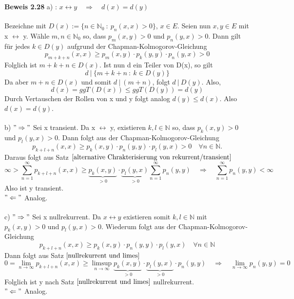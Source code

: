 \textbf{Beweis 2.28}
a) : $x \leftrightarrow y \quad \Rightarrow \quad d(x) = d(y)$
\\
\\
Bezeichne mit $D(x) := \lbrace n \in \mathbb{N}_{0} \: : \: p_{n}(x,x)>0 \rbrace$, $x \in E$. Seien nun $x,y \in E$ mit x $\leftrightarrow$ y. Wähle $m,n \in \mathbb{N}_{0}$ so, dass $p_{m}(x,y)>0$ und $p_{n}(y,x)>0$. Dann gilt für jedes $k \in D(y)$ aufgrund der Chapman-Kolmogorov-Gleichung
\begin{equation*}
p_{m+k+n}(x,x) \geq p_{m}(x,y) \cdot p_{k}(y,y) \cdot p_{n}(y,x) > 0
\end{equation*}
Folglich ist $m+k+n \in D(x)$. Ist nun d ein Teiler von D(x), so gilt
\begin{equation*}
 d \: | \: \lbrace m+k+n \: : \: k \in D(y) \rbrace
\end{equation*} 
Da aber $m+n \in D(x)$ und somit $d \: | \: (m+n)$, folgt $d \: | \: D(y)$. Also, 
\begin{equation*}
d(x) = ggT(D(x)) \leq ggT(D(y)) = d(y)
\end{equation*}
Durch Vertauschen der Rollen von x und y folgt analog $d(y) \leq d(x)$. Also $d(x) = d(y)$.
\\
\\
b) $"\Rightarrow"$ Sei x transient. Da x $\leftrightarrow$ y, existieren $k,l \in \mathbb{N}$ so, dass  $p_{k}(x,y)>0$ und $p_{l}(y,x)>0$. Dann folgt aus der Chapman-Kolmogorov-Gleichung
\begin{equation*}
p_{k+l+n}(x,x) \geq p_{k}(x,y) \cdot p_{n}(y,y) \cdot p_{l}(y,x) > 0 \quad \forall n \in \mathbb{N}.
\end{equation*}
Daraus folgt aus Satz $\ref{alternative Chrakterisierung von rekurrent/transient}$ 
\begin{equation*}
\infty > \sum_{n=1}^{\infty} p_{k+l+n}(x,x) \geq \underbrace{p_{k}(x,y)}_{>0} \cdot \underbrace{p_{l}(y,x)}_{>0} \sum_{n=1}^{\infty} p_{n}(y,y) \quad \Rightarrow \quad \sum_{n=1}^{\infty} p_{n}(y,y) < \infty
\end{equation*}
Also ist y transient.
\\
$"\Leftarrow"$ Analog.
\\
\\
c) \: $"\Rightarrow"$ Sei x nullrekurrent. Da $x \leftrightarrow y$ existieren somit $k,l \in \mathbb{N}$ mit $p_{k}(x,y) > 0$ und $p_{l}(y,x) > 0$. Wiederum folgt aus der Chapman-Kolmogorov-Gleichung
\begin{equation*}
p_{k+l+n}(x,x) \geq p_{k}(x,y) \cdot p_{n}(y,y) \cdot p_{l}(y,x) \quad \forall n \in \mathbb{N}
\end{equation*}
Dann folgt aus Satz $\ref{nullrekurrent und limes}$
\begin{equation*}
0 = \lim_{n \to \infty}p_{k+l+n}(x,x) \geq \limsup_{n \to \infty} \underbrace{p_{k}(x,y)}_{>0} \cdot \underbrace{p_{l}(y,x)}_{>0} \cdot p_{n}(y,y) \quad \Rightarrow \quad \lim_{n \to \infty} p_{n}(y,y) = 0
\end{equation*}
Folglich ist y nach Satz $\ref{nullrekurrent und limes}$ nullrekurrent.
\\
$"\Leftarrow"$ Analog.

